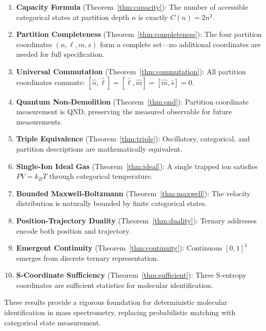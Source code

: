 \documentclass[twocolumn,10pt]{article}
\begin{document}
\begin{enumerate}
    \item \textbf{Capacity Formula} (Theorem~\ref{thm:capacity}): The number of accessible categorical states at partition depth $n$ is exactly $C(n) = 2n^2$.

    \item \textbf{Partition Completeness} (Theorem~\ref{thm:completeness}): The four partition coordinates $(n, \ell, m, s)$ form a complete set---no additional coordinates are needed for full specification.

    \item \textbf{Universal Commutation} (Theorem~\ref{thm:commutation}): All partition coordinates commute: $[\hat{n}, \hat{\ell}] = [\hat{\ell}, \hat{m}] = [\hat{m}, \hat{s}] = 0$.

    \item \textbf{Quantum Non-Demolition} (Theorem~\ref{thm:qnd}): Partition coordinate measurement is QND, preserving the measured observable for future measurements.

    \item \textbf{Triple Equivalence} (Theorem~\ref{thm:triple}): Oscillatory, categorical, and partition descriptions are mathematically equivalent.

    \item \textbf{Single-Ion Ideal Gas} (Theorem~\ref{thm:ideal}): A single trapped ion satisfies $PV = k_B T$ through categorical temperature.

    \item \textbf{Bounded Maxwell-Boltzmann} (Theorem~\ref{thm:maxwell}): The velocity distribution is naturally bounded by finite categorical states.

    \item \textbf{Position-Trajectory Duality} (Theorem~\ref{thm:duality}): Ternary addresses encode both position and trajectory.

    \item \textbf{Emergent Continuity} (Theorem~\ref{thm:continuity}): Continuous $[0,1]^3$ emerges from discrete ternary representation.

    \item \textbf{S-Coordinate Sufficiency} (Theorem~\ref{thm:sufficient}): Three S-entropy coordinates are sufficient statistics for molecular identification.
\end{enumerate}

These results provide a rigorous foundation for deterministic molecular identification in mass spectrometry, replacing probabilistic matching with categorical state measurement.
\end{document}

